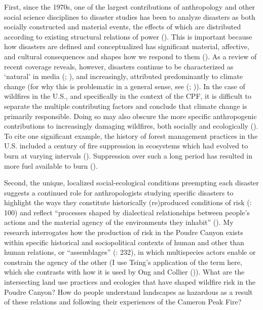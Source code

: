 \documentclass[
]{article}
\begin{document}
First, since the 1970s, one of the largest contributions of anthropology and other social science disciplines to disaster studies has been to analyze disasters as both socially constructed and material events, the effects of which are distributed according to existing structural relations of power (). This is important because how disasters are defined and conceptualized has significant material, affective, and cultural consequences and shapes how we respond to them (). As a review of recent coverage reveals, however, disasters continue to be characterized as `natural' in media (; ), and increasingly, attributed predominantly to climate change (for why this is problematic in a general sense, see (; )). In the case of wildfires in the U.S., and specifically in the context of the CPF, it is difficult to separate the multiple contributing factors and conclude that climate change is primarily responsible. Doing so may also obscure the more specific anthropogenic contributions to increasingly damaging wildfires, both socially and ecologically (). To cite one significant example, the history of forest management practices in the U.S. included a century of fire suppression in ecosystems which had evolved to burn at varying intervals (). Suppression over such a long period has resulted in more fuel available to burn ().

Second, the unique, localized social-ecological conditions preempting each disaster suggests a continued role for anthropologists studying specific disasters to highlight the ways they constitute historically (re)produced conditions of risk (: 100) and reflect ``processes shaped by dialectical relationships between people's actions and the material agency of the environments they inhabit'' (). My research interrogates how the production of risk in the Poudre Canyon exists within specific historical and sociopolitical contexts of human and other than human relations, or ``assemblages'' (: 232), in which multispecies actors enable or constrain the agency of the other (I use Tsing's application of the term here, which she contrasts with how it is used by Ong and Collier ()). What are the intersecting land use practices and ecologies that have shaped wildfire risk in the Poudre Canyon? How do people understand landscapes as hazardous as a result of these relations and following their experiences of the Cameron Peak Fire?
\end{document}
